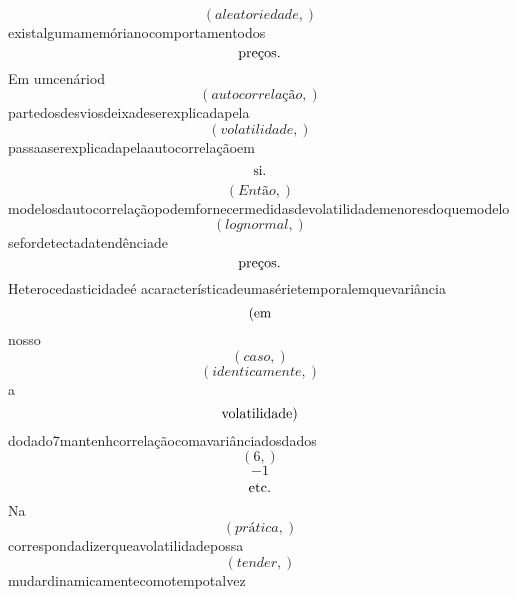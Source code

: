 \documentclass{article}
\begin{document}
\begin{equation}
\left( aleatoriedade,\right)
\end{equation}existalgumamemórianocomportamentodos\begin{equation}
$preços.$
\end{equation}Em umcenáriod\begin{equation}
\left( autocorrelação,\right)
\end{equation}partedosdesviosdeixadeserexplicadapela\begin{equation}
\left( volatilidade,\right)
\end{equation}passaaserexplicadapelaautocorrelaçãoem\begin{equation}
$si.$
\end{equation}\begin{equation}
\left( Então,\right)
\end{equation}modelosdautocorrelaçãopodemfornecermedidasdevolatilidademenoresdoquemodelo\begin{equation}
\left( lognormal,\right)
\end{equation}sefordetectadatendênciade\begin{equation}
$preços.$
\end{equation}Heterocedasticidadeé acaracterísticadeumasérietemporalemquevariância\begin{equation}
$(em$
\end{equation}nosso\begin{equation}
\left( caso,\right)
\end{equation}\begin{equation}
\left( identicamente,\right)
\end{equation}a\begin{equation}
$volatilidade)$
\end{equation}dodado7mantenhcorrelaçãocomavariânciadosdados\begin{equation}
\left( 6,\right)
\end{equation}\begin{equation}
-1
\end{equation}\begin{equation}
$etc.$
\end{equation}Na\begin{equation}
\left( prática,\right)
\end{equation}correspondadizerqueavolatilidadepossa\begin{equation}
\left( tender,\right)
\end{equation}mudardinamicamentecomotempotalvez\begin{equation}

\end{equation}
\end{document}
